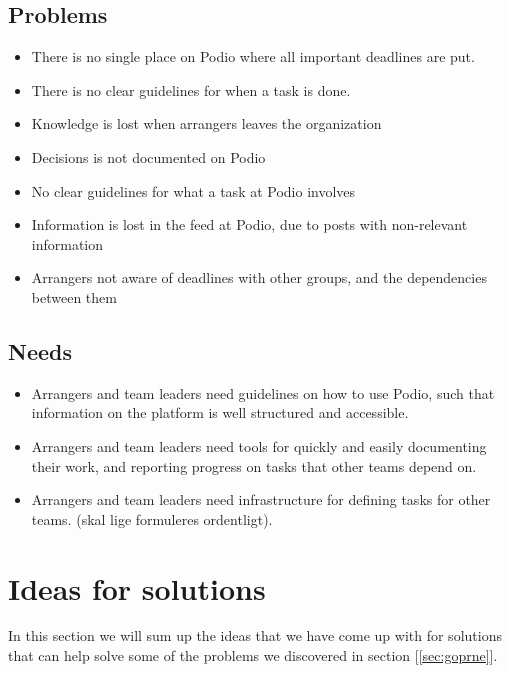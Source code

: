 \subsection{Problems}
\label{subsec:problems}
\begin{itemize}
    \item There is no single place on Podio where all important deadlines are put.
    \item There is no clear guidelines for when a task is done.
	 \item Knowledge is lost when arrangers leaves the organization
	 \item Decisions is not documented on Podio
	 \item No clear guidelines for what a task at Podio involves
	 \item Information is lost in the feed at Podio, due to posts with non-relevant information
	 \item Arrangers not aware of deadlines with other groups, and the dependencies between them
	 
\end{itemize}

\subsection{Needs}
\label{subsec:needs}
\begin{itemize}
    \item Arrangers and team leaders need guidelines on how to use Podio, such that information on the platform is well structured and accessible.
    \item Arrangers and team leaders need tools for quickly and easily documenting their work, and reporting progress on tasks that other teams depend on.
    \item Arrangers and team leaders need infrastructure for defining tasks for other teams. (skal lige formuleres ordentligt).
\end{itemize}

\section{Ideas for solutions}
\label{sec:ideas}
In this section we will sum up the ideas that we have come up with for solutions
that can help solve some of the problems we discovered in section [\ref{sec:goprne}].

